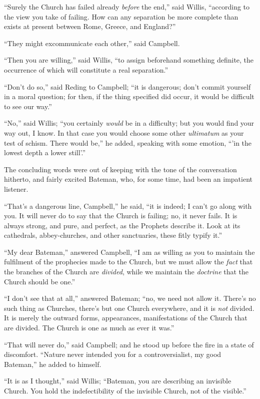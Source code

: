 ``Surely the Church has failed already \emph{before} the
end,'' said Willis, ``according to the view you take of
failing. How can any separation be more complete than exists at
present between Rome, Greece, and England?''

``They might excommunicate each other,'' said Campbell.

``Then you are willing,'' said Willis, ``to assign
beforehand something definite, the occurrence of which will constitute
a real separation.''

``Don't do so,'' said Reding to Campbell; ``it is
dangerous; don't commit yourself in a moral question; for then, if the
thing specified did occur, it would be difficult to see our way.''

``No,'' said Willis; ``you certainly \emph{would} be in
a difficulty; but you would find your way out, I know. In that case
you would choose some other \emph{ultimatum} as your test of schism.
There would be,'' he added, speaking with some emotion, ``'in
the lowest depth a lower still'.''

The concluding words were out of keeping with the tone of the
conversation hitherto, and fairly excited Bateman, who, for some time,
had been an impatient listener.

``That's a dangerous line, Campbell,'' he said, ``it is
indeed; I can't go along with you. It will never do to say that the
Church is failing; no, it never fails. It is always strong, and pure,
and perfect, as the Prophets describe it. Look at its cathedrals,
abbey-churches, and other sanctuaries, these fitly typify it.''

``My dear Bateman,'' answered Campbell, ``I am as
willing as you to maintain the fulfilment of the prophecies made to
the Church, but we must allow the \emph{fact} that the branches of the
Church are \emph{divided}, while we maintain the \emph{doctrine}
that the Church should be one.''

``I don't see that at all,'' answered Bateman; ``no, we
need not allow it. There's no such thing as Churches, there's but one
Church everywhere, and it is \emph{not} divided. It is merely the
outward forms, appearances, manifestations of the Church that are
divided. The Church is one as much as ever it was.''

``That will never do,'' said Campbell; and he stood up
before the fire in a state of discomfort. ``Nature never intended
you for a controversialist, my good Bateman,'' he added to
himself.

``It is as I thought,'' said Willis; ``Bateman, you are
describing an invisible Church. You hold the indefectibility of the
invisible Church, not of the visible.''

